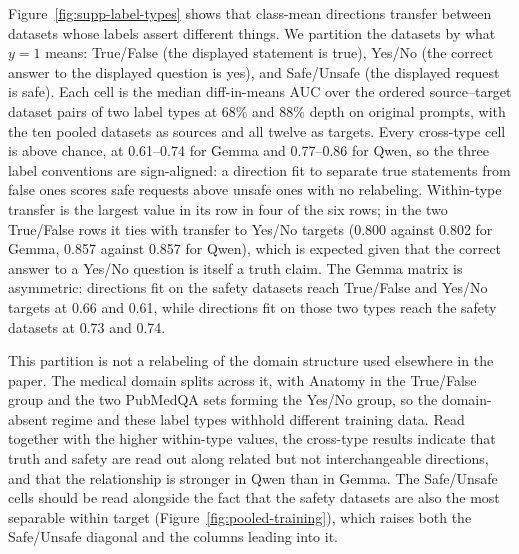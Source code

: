 Figure~\ref{fig:supp-label-types} shows that class-mean directions transfer
between datasets whose labels assert different things. We partition the
datasets by what $y=1$ means: True/False (the displayed statement is true),
Yes/No (the correct answer to the displayed question is yes), and Safe/Unsafe
(the displayed request is safe). Each cell is the median diff-in-means AUC over
the ordered source--target dataset pairs of two label types at 68\% and 88\%
depth on original prompts, with the ten pooled datasets as sources and all
twelve as targets. Every cross-type cell is above chance, at 0.61--0.74 for
Gemma and 0.77--0.86 for Qwen, so the three label conventions are sign-aligned:
a direction fit to separate true statements from false ones scores safe
requests above unsafe ones with no relabeling.
Within-type transfer is the largest value in its row in four of the six rows;
in the two True/False rows it ties with transfer to Yes/No targets (0.800
against 0.802 for Gemma, 0.857 against 0.857 for Qwen), which is expected given
that the correct answer to a Yes/No question is itself a truth claim. The Gemma
matrix is asymmetric: directions fit on the safety datasets reach True/False
and Yes/No targets at 0.66 and 0.61, while directions fit on those two types
reach the safety datasets at 0.73 and 0.74.

This partition is not a relabeling of the domain structure used elsewhere in
the paper. The medical domain splits across it, with Anatomy in the True/False
group and the two PubMedQA sets forming the Yes/No group, so the domain-absent
regime and these label types withhold different training data. Read together
with the higher within-type values, the cross-type results indicate that truth
and safety are read out along related but not interchangeable directions, and
that the relationship is stronger in Qwen than in Gemma. The Safe/Unsafe cells
should be read alongside the fact that the safety datasets are also the most
separable within target (Figure~\ref{fig:pooled-training}), which raises both
the Safe/Unsafe diagonal and the columns leading into it.



